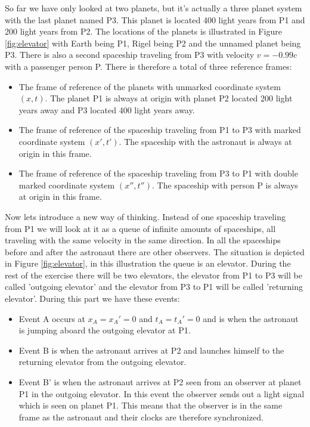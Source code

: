 {\begin{multicols}{2}
So far we have only looked at two planets, but it's actually a three planet system with the last planet named P3. This planet is located 400 light years from P1 and 200 light years from P2. The locations of the planets is illustrated in Figure \ref{fig:elevator} with Earth being P1, Rigel being P2 and the unnamed planet being P3. There is also a second spaceship traveling from P3 with velocity $v=-0.99c$ with a passenger person P. There is therefore a total of three reference frames:
\begin{itemize}
\item The frame of reference of the planets with unmarked coordinate system $(x,t)$. The planet P1 is always at origin with planet P2 located 200 light years away and P3 located 400 light years away.
\item The frame of reference of the spaceship traveling from P1 to P3 with marked coordinate system $(x',t')$. The spaceship with the astronaut is always at origin in this frame.
\item The frame of reference of the spaceship traveling from P3 to P1 with double marked coordinate system $(x'',t'')$. The spaceship with person P is always at origin in this frame.
\end{itemize}

Now lets introduce a new way of thinking. Instead of one spaceship traveling from P1 we will look at it as a queue of infinite amounts of spaceships, all traveling with the same velocity in the same direction. In all the spaceships before and after the astronaut there are other observers. The situation is depicted in Figure \ref{fig:elevator}, in this illustration the queue is an elevator. During the rest of the exercise there will be two elevators, the elevator from P1 to P3 will be called 'outgoing elevator' and the elevator from P3 to P1 will be called 'returning elevator'. During this part we have these events:
\begin{itemize}
\item Event A occurs at $x_A=x_A'=0$ and $t_A=t_A'=0$ and is when the astronaut is jumping aboard the outgoing elevator at P1.
\item Event B is when the astronaut arrives at P2 and launches himself to the returning elevator from the outgoing elevator.
\item Event B' is when the astronaut arrives at P2 seen from an observer at planet P1 in the outgoing elevator. In this event the observer sends out a light signal which is seen on planet P1. This means that the observer is in the same frame as the astronaut and their clocks are therefore synchronized.
\end{itemize}


\end{multicols}}
